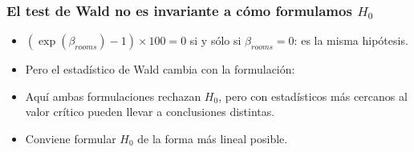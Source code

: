 \documentclass[t, compress, spanish, aspectratio=169]{beamer}
\begin{document}
\begin{frame}
\frametitle{El test de Wald no es invariante a c\'omo formulamos $H_0$}
\begin{itemize}
    \item $(\exp(\beta_{rooms})-1)\times 100=0$ si y s\'olo si $\beta_{rooms}=0$: es la misma hip\'otesis.
    \item Pero el estad\'istico de Wald cambia con la formulaci\'on:
\end{itemize}
\begin{center}
\footnotesize

\end{center}
\begin{itemize}
    \item Aqu\'i ambas formulaciones rechazan $H_0$, pero con estad\'isticos m\'as cercanos al valor cr\'itico pueden llevar a conclusiones distintas.
    \item Conviene formular $H_0$ de la forma m\'as lineal posible.
\end{itemize}
\end{frame}
\end{document}
